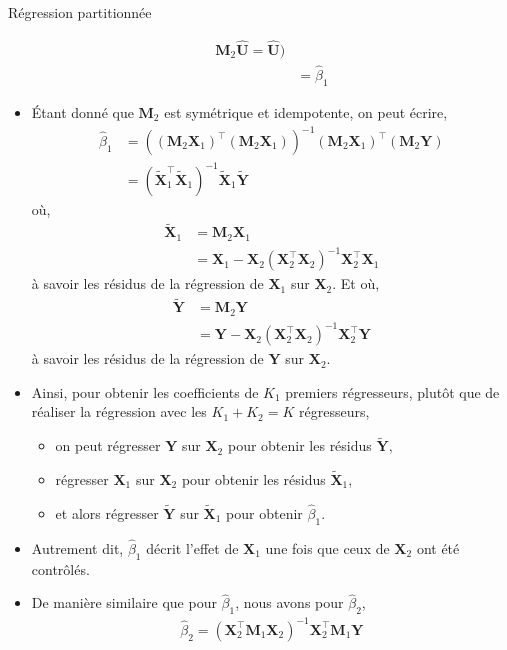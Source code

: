 \begin{frame}[allowframebreaks]{Régression partitionnée}
\begin{itemize}
\begin{align*}
\mathbf{M}_2\widehat{\mathbf{U}} = \widehat{\mathbf{U}})\\
&=\widehat{\beta}_1
\end{align*}
\item \'Etant donné que $\mathbf{M}_2$ est symétrique et idempotente, on peut écrire,
\begin{align*}
\widehat{\beta}_1 &= \left((\mathbf{M}_2\mathbf{X}_1)^\top(\mathbf{M}_2\mathbf{X}_1)\right)^{-1}
(\mathbf{M}_2\mathbf{X}_1)^\top(\mathbf{M}_2\mathbf{Y})\\
&=\left(\tilde{\mathbf{X}}_1^\top\tilde{\mathbf{X}}_1\right)^{-1}\tilde{\mathbf{X}}_1\tilde{\mathbf{Y}}
\end{align*}
où,
\begin{align*}
\tilde{\mathbf{X}}_1&=\mathbf{M}_2\mathbf{X}_1\\
&= \mathbf{X}_1 - \mathbf{X}_2(\mathbf{X}_2^\top\mathbf{X}_2)^{-1}\mathbf{X}_2^\top\mathbf{X}_1
\end{align*}
à savoir les résidus de la régression de $\mathbf{X}_1$ sur $\mathbf{X}_2$. Et où,
\begin{align*}
\tilde{\mathbf{Y}}&=\mathbf{M}_2\mathbf{Y}\\
&= \mathbf{Y} - \mathbf{X}_2(\mathbf{X}_2^\top\mathbf{X}_2)^{-1}\mathbf{X}_2^\top\mathbf{Y}
\end{align*}
à savoir les résidus de la régression de $\mathbf{Y}$ sur $\mathbf{X}_2$.
\item Ainsi, pour obtenir les coefficients de $K_1$ premiers régresseurs, plutôt que de réaliser la régression avec les $K_1+K_2 =K$ régresseurs,
\begin{itemize}
\item on peut régresser $\mathbf{Y}$ sur $\mathbf{X}_2$ pour obtenir les résidus $\tilde{\mathbf{Y}}$, 
\item régresser $\mathbf{X}_1$ sur $\mathbf{X}_2$ pour obtenir les résidus $\tilde{\mathbf{X}}_1$, 
\item et alors régresser $\tilde{\mathbf{Y}}$ sur $\tilde{\mathbf{X}}_1$ pour obtenir $\widehat{\beta}_1$. 
\end{itemize}
\item Autrement dit, $\widehat{\beta}_1$ décrit l'effet de $\mathbf{X}_1$ une fois que ceux de $\mathbf{X}_2$ ont été contrôlés.
\item De manière similaire que pour $\widehat{\beta}_1$, nous avons pour $\widehat{\beta}_2$,
\begin{align*}
\widehat{\beta}_2 = (\mathbf{X}_2^\top\mathbf{M}_1\mathbf{X}_2)^{-1} \mathbf{X}_2^\top\mathbf{M}_1\mathbf{Y}

\end{align*}
\end{itemize}
\end{frame}
